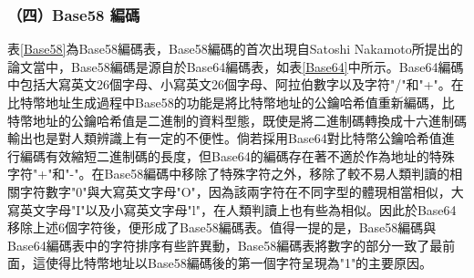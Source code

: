 				

					

				\subsubsection{（四）Base58 編碼}

				表\ref{Base58}為Base58編碼表，Base58編碼的首次出現自Satoshi Nakamoto所提出的論文\supercite{bitcoinpaper}當中，Base58編碼是源自於Base64編碼表，如表\ref{Base64}中所示。Base64編碼中包括大寫英文26個字母、小寫英文26個字母、阿拉伯數字以及字符"/"和"+"。在比特幣地址生成過程中Base58的功能是將比特幣地址的公鑰哈希值重新編碼，比特幣地址的公鑰哈希值是二進制的資料型態，既使是將二進制碼轉換成十六進制碼輸出也是對人類辨識上有一定的不便性。倘若採用Base64對比特幣公鑰哈希值進行編碼有效縮短二進制碼的長度，但Base64的編碼存在著不適於作為地址的特殊字符"+"和"-"。在Base58編碼中移除了特殊字符之外，移除了較不易人類判讀的相關字符數字"0"與大寫英文字母"O"，因為該兩字符在不同字型的體現相當相似，大寫英文字母"I"以及小寫英文字母"l"，在人類判讀上也有些為相似。因此於Base64移除上述6個字符後，便形成了Base58編碼表。值得一提的是，Base58編碼與Base64編碼表中的字符排序有些許異動，Base58編碼表將數字的部分一致了最前面，這使得比特幣地址以Base58編碼後的第一個字符呈現為"1"的主要原因。

